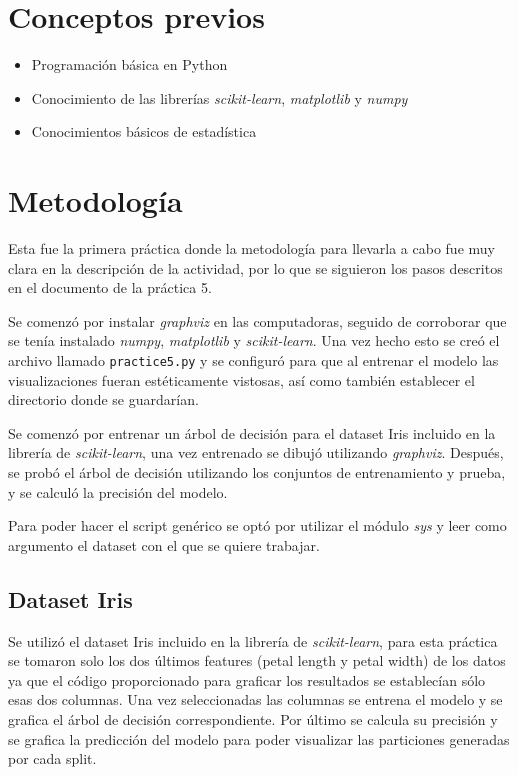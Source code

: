\documentclass[sigconf,authorversion,nonacm]{acmart}
\begin{document}
\section{Conceptos previos}
\begin{itemize}
  \item Programación básica en Python
  \item Conocimiento de las librerías \textit{scikit-learn}, \textit{matplotlib} y \textit{numpy}
  \item Conocimientos básicos de estadística
\end{itemize}


\section{Metodología}
Esta fue la primera práctica donde la metodología para llevarla a cabo fue muy clara en la descripción de la actividad, por lo que se siguieron los pasos descritos en el documento de la práctica 5.

Se comenzó por instalar \textit{graphviz} en las computadoras, seguido de corroborar que se tenía instalado \textit{numpy}, \textit{matplotlib} y \textit{scikit-learn}.
Una vez hecho esto se creó el archivo llamado \texttt{practice5.py} y se configuró para que al entrenar el modelo las visualizaciones fueran estéticamente vistosas, así como también establecer el directorio donde se guardarían.

Se comenzó por entrenar un árbol de decisión para el dataset Iris incluido en la librería de \textit{scikit-learn}, una vez entrenado se dibujó utilizando \textit{graphviz}.
Después, se probó el árbol de decisión utilizando los conjuntos de entrenamiento y prueba, y se calculó la precisión del modelo.

Para poder hacer el script genérico se optó por utilizar el módulo \textit{sys} y leer como argumento el dataset con el que se quiere trabajar.

\subsection{Dataset Iris}
Se utilizó el dataset Iris incluido en la librería de \textit{scikit-learn}, para esta práctica se tomaron solo los dos últimos features (petal length y petal width) de los datos ya que el código proporcionado para graficar los resultados se establecían sólo esas dos columnas. 
Una vez seleccionadas las columnas se entrena el modelo y se grafica el árbol de decisión correspondiente.
Por último se calcula su precisión y se grafica la predicción del modelo para poder visualizar las particiones generadas por cada split.
\end{document}
